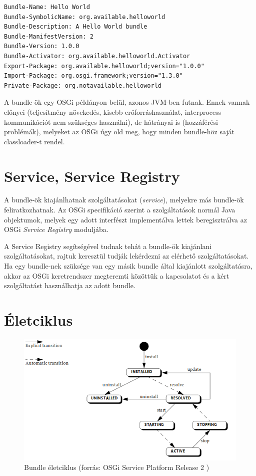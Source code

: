 \begin{lstlisting}[label={lst:manifest}, caption=MANIFEST.MF,breaklines=true]
Bundle-Name: Hello World
Bundle-SymbolicName: org.available.helloworld
Bundle-Description: A Hello World bundle
Bundle-ManifestVersion: 2
Bundle-Version: 1.0.0
Bundle-Activator: org.available.helloworld.Activator
Export-Package: org.available.helloworld;version="1.0.0"
Import-Package: org.osgi.framework;version="1.3.0"
Private-Package: org.notavailable.helloworld
\end{lstlisting}


A bundle-ök egy OSGi példányon belül, azonos JVM-ben futnak. Ennek vannak előnyei (teljesítmény növekedés, kisebb erőforráshasználat, interprocess kommunikációt nem szükséges használni), de hátrányai is (hozzáférési problémák), melyeket az OSGi úgy old meg, hogy minden bundle-höz saját classloader-t rendel.

\section{Service, Service Registry}
\label{sec:service}

A bundle-ök kiajánlhatnak szolgáltatásokat (\textit{service}), melyekre más bundle-ök feliratkozhatnak. Az OSGi specifikáció szerint a szolgáltatások normál Java objektumok, melyek egy adott interfészt implementálva lettek beregisztrálva az OSGi \textit{Service Registry} moduljába.

A Service Registry segítségével tudnak tehát a bundle-ök kiajánlani szolgáltatásokat, rajtuk keresztül tudják lekérdezni az elérhető szolgáltatásokat. Ha egy bundle-nek szüksége van egy másik bundle által kiajánlott szolgáltatásra, akkor az OSGi keretrendszer megteremti közöttük a kapcsolatot és a kért szolgáltatást használhatja az adott bundle.


\section{Életciklus}
\label{sec:lifecycle}

\begin{figure}[htb]
\centering
\includegraphics[scale=0.5]{img/bundle_lifecycle}
\caption{Bundle életciklus (forrás: OSGi Service Platform Release 2 \cite{osgi})}
\label{fig:bundle_lifecycle}
\end{figure}

